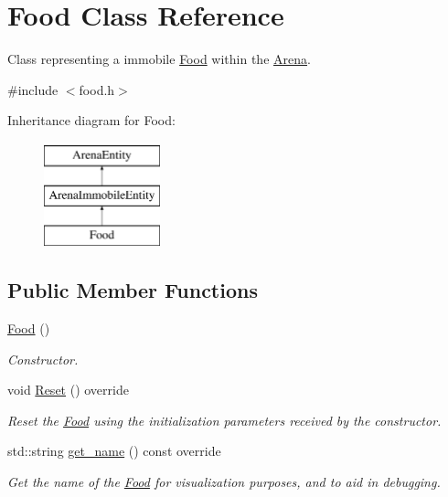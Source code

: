 \hypertarget{class_food}{}\section{Food Class Reference}
\label{class_food}


Class representing a immobile \mbox{\hyperlink{class_food}{Food}} within the \mbox{\hyperlink{class_arena}{Arena}}.  




{\ttfamily \#include $<$food.\+h$>$}

Inheritance diagram for Food\+:\begin{figure}[H]
\begin{center}
\leavevmode
\includegraphics[height=3.000000cm]{class_food}
\end{center}
\end{figure}
\subsection*{Public Member Functions}
\begin{DoxyCompactItemize}
\item 
\mbox{\hyperlink{class_food_a75d4d7f76fd495cc8133302ca9fdc485}{Food}} ()
\begin{DoxyCompactList}\small\item\em Constructor. \end{DoxyCompactList}\item 
\mbox{\label{class_food_a1a12bfd50400e04b595c24a512317c1a}} 
void \mbox{\hyperlink{class_food_a1a12bfd50400e04b595c24a512317c1a}{Reset}} () override
\begin{DoxyCompactList}\small\item\em Reset the \mbox{\hyperlink{class_food}{Food}} using the initialization parameters received by the constructor. \end{DoxyCompactList}\item 
std\+::string \mbox{\hyperlink{class_food_a5c3bcd5109750a15ebb24b8a2a3cdd07}{get\+\_\+name}} () const override
\begin{DoxyCompactList}\small\item\em Get the name of the \mbox{\hyperlink{class_food}{Food}} for visualization purposes, and to aid in debugging. \end{DoxyCompactList}\end{DoxyCompactItemize}


